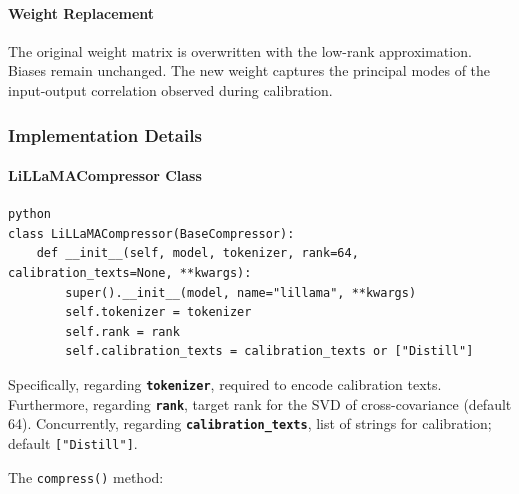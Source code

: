 \paragraph{Weight Replacement}

The original weight matrix is overwritten with the low-rank approximation. Biases remain unchanged. The new weight captures the principal modes of the input-output correlation observed during calibration.


\subsubsection*{Implementation Details}

\paragraph{LiLLaMACompressor Class}

\vspace{0.5em}
\begin{mdframed}[backgroundcolor=codebg, linecolor=codeframe, linewidth=1pt, roundcorner=4pt, innerleftmargin=2pt, innerrightmargin=5pt, innertopmargin=5pt, innerbottommargin=5pt]
\begin{lstlisting}
python
class LiLLaMACompressor(BaseCompressor):
    def __init__(self, model, tokenizer, rank=64, calibration_texts=None, **kwargs):
        super().__init__(model, name="lillama", **kwargs)
        self.tokenizer = tokenizer
        self.rank = rank
        self.calibration_texts = calibration_texts or ["Distill"]
\end{lstlisting}
\end{mdframed}
\vspace{0.5em}

Specifically, regarding \textbf{\texttt{tokenizer}}, required to encode calibration texts. Furthermore, regarding \textbf{\texttt{rank}}, target rank for the SVD of cross-covariance (default 64). Concurrently, regarding \textbf{\texttt{calibration\_texts}}, list of strings for calibration; default \texttt{["Distill"]}.


The \texttt{compress()} method:


